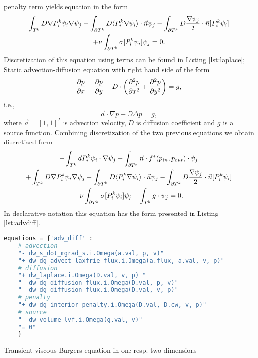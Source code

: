 penalty term yields equation in the form
\begin{multline}
    \int_{T^k} D\nabla P^k_i\psi_i \nabla \psi_j
    - \int_{\partial T^k} D \langle P^k_i\nabla\psi_i\rangle \cdot \vec{n}\psi_j 
    - \int_{\partial T^k} D \frac{\nabla \psi_j}{2}\cdot \vec{n} [P^k_i\psi_i] \\ 
    + \nu \int_{\partial T^k} \sigma [P^k_i\psi_i]\psi_j 
    = 0.
\end{multline}
Discretization of this equation using \sfepy{} terms can be found in Listing 
\ref{lst:laplace};\\
Static advection-diffusion equation with right hand side of the form
\begin{equation}
\label{eq:ex_advdiff}
\frac{\partial p}{\partial x} + \frac{\partial p}{\partial y} - D \cdot \left( \frac{\partial^2 p}{\partial x^2} + \frac{\partial^2 
p}{\partial y^2} \right) = g,
\end{equation}
i.e.,
\begin{equation}
\vec{a} \cdot \nabla p - D \Delta p = g,
\end{equation}
where $\vec{a} = [1, 1]^T$ is advection velocity, $D$ is diffusion coefficient 
and $g$ is a source function. Combining discretization of the two previous 
equations we obtain discretized form
\begin{multline}
- \int_{T^k} \vec{a}P_i^k\psi_i\cdot\nabla\psi_j 
+ \int_{\partial{T^k}} \vec{n}\cdot f^{*} (p_{in}, p_{out})\cdot\psi_j\\
+ \int_{T^k} D\nabla P^k_i\psi_i \nabla \psi_j
- \int_{\partial T^k} D \langle P^k_i\nabla\psi_i\rangle \cdot \vec{n}\psi_j
- \int_{\partial T^k} D \frac{\nabla \psi_j}{2}\cdot \vec{n} [P^k_i\psi_i] \\
+ \nu \int_{\partial T^k} \sigma [P^k_i\psi_i]\psi_j
- \int_{T^k} g\cdot \psi_j
= 0.
\end{multline}
In \sfepy{} declarative notation this equation has the form presented in 
Listing \ref{lst:advdiff}.
\setcounter{lstannotation}{0}
\begin{lstlisting}[language=Python, caption=Static advection-diffusion equation
\label{lst:advdiff}]
equations = {'adv_diff' :
    # advection
    "- dw_s_dot_mgrad_s.i.Omega(a.val, p, v)"
    "+ dw_dg_advect_laxfrie_flux.i.Omega(a.flux, a.val, v, p)"
    # diffusion
    "+ dw_laplace.i.Omega(D.val, v, p) "
    "- dw_dg_diffusion_flux.i.Omega(D.val, p, v)"
    "- dw_dg_diffusion_flux.i.Omega(D.val, v, p)"
    # penalty
    "+ dw_dg_interior_penalty.i.Omega(D.val, D.cw, v, p)"
    # source
    "- dw_volume_lvf.i.Omega(g.val, v)"
    "= 0"
    }
\end{lstlisting}
Transient viscous Burgers equation in one resp. two dimensions
